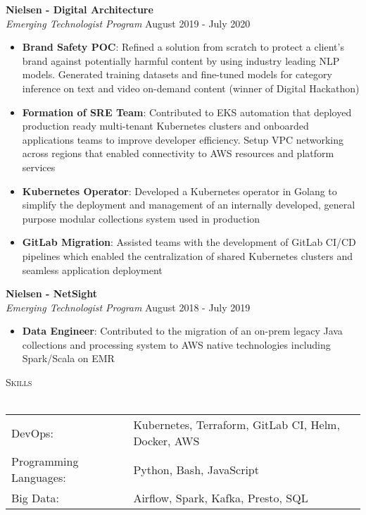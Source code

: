 \documentclass[a4paper]{article}
\newcommand{\lineunder} {
    \vspace*{-8pt} \\
    \hspace*{-18pt} \hrulefill \\
}
\newcommand{\header} [1] {
    {\hspace*{-18pt}\vspace*{6pt} \textsc{#1}}
    \vspace*{-6pt} \lineunder
}
\begin{document}
\textbf{Nielsen - Digital Architecture}\\
\textit{Emerging Technologist Program} \hfill August 2019 - July 2020\\
\vspace{-1mm}
\begin{itemize} \itemsep 1pt
	\item \textbf{Brand Safety POC}: Refined a solution from scratch to protect a client's brand against potentially harmful content by using industry leading NLP models. Generated training datasets and fine-tuned models for category inference on text and video on-demand content (winner of Digital Hackathon)
    \item \textbf{Formation of SRE Team}: Contributed to EKS automation that deployed production ready multi-tenant Kubernetes clusters and onboarded applications teams to improve developer efficiency. Setup VPC networking across regions that enabled connectivity to AWS resources and platform services
    \item \textbf{Kubernetes Operator}: Developed a Kubernetes operator in Golang to simplify the deployment and management of an internally developed, general purpose modular collections system used in production
    \item \textbf{GitLab Migration}: Assisted teams with the development of GitLab CI/CD pipelines which enabled the centralization of shared Kubernetes clusters and seamless application deployment
\end{itemize}

\textbf{Nielsen - NetSight}\\
\textit{Emerging Technologist Program} \hfill August 2018 - July 2019\\
\vspace{-1mm}
\begin{itemize} \itemsep 1pt
	\item \textbf{Data Engineer}: Contributed to the migration of an on-prem legacy Java collections and processing system to AWS native technologies including Spark/Scala on EMR
\end{itemize}

\header{Skills}
\vspace*{1mm}
\begin{tabular}{ l l }
	DevOps:                & Kubernetes, Terraform, GitLab CI, Helm, Docker, AWS                    \\
	Programming Languages: & Python, Bash, JavaScript                                               \\
	Big Data:              & Airflow, Spark, Kafka, Presto, SQL                                     \\
\end{tabular}
\vspace{3mm}
\end{document}
